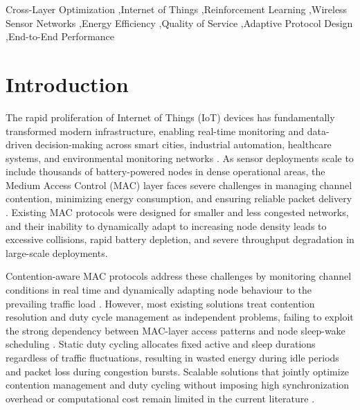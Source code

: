 \documentclass[a4paper]{cas-dc}
\numberwithin{equation}{section}
\begin{document}
\begin{keywords}
Cross-Layer Optimization \sep Internet of Things \sep Reinforcement Learning \sep Wireless Sensor Networks \sep Energy Efficiency \sep Quality of Service \sep Adaptive Protocol Design \sep End-to-End Performance
\end{keywords}

\maketitle
\section{Introduction}
\label{sec:intro}

The rapid proliferation of Internet of Things (IoT) devices has fundamentally transformed modern infrastructure, enabling real-time monitoring and data-driven decision-making across smart cities, industrial automation, healthcare systems, and environmental monitoring networks \cite{Thakur2025}. As sensor deployments scale to include thousands of battery-powered nodes in dense operational areas, the Medium Access Control (MAC) layer faces severe challenges in managing channel contention, minimizing energy consumption, and ensuring reliable packet delivery \cite{Ojeda2024}. Existing MAC protocols were designed for smaller and less congested networks, and their inability to dynamically adapt to increasing node density leads to excessive collisions, rapid battery depletion, and severe throughput degradation in large-scale deployments.




Contention-aware MAC protocols address these challenges by monitoring channel conditions in real time and dynamically adapting node behaviour to the prevailing traffic load \cite{Bhushan2025}. However, most existing solutions treat contention resolution and duty cycle management as independent problems, failing to exploit the strong dependency between MAC-layer access patterns and node sleep-wake scheduling \cite{Mustafa2024}. Static duty cycling allocates fixed active and sleep durations regardless of traffic fluctuations, resulting in wasted energy during idle periods and packet loss during congestion bursts. Scalable solutions that jointly optimize contention management and duty cycling without imposing high synchronization overhead or computational cost remain limited in the current literature \cite{Hannachi2025}.
\end{document}
